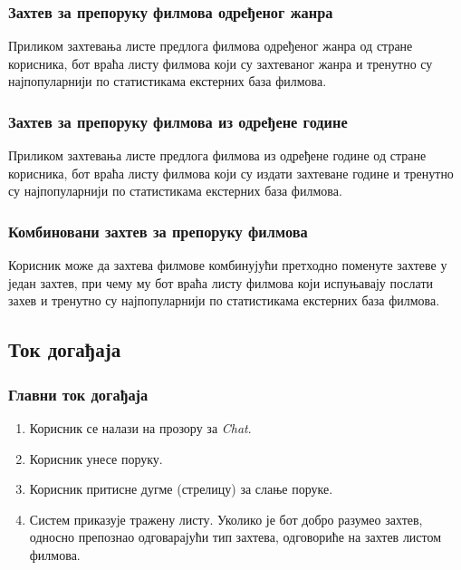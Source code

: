 \documentclass[12pt,a4paper]{article}
\begin{document}
\subsubsection{Захтев за препоруку филмова одређеног жанра}

Приликом захтевања листе предлога филмова одређеног жанра од стране корисника, бот враћа листу филмова који
су захтеваног жанра и тренутно су најпопуларнији по статистикама екстерних база филмова.

\subsubsection{Захтев за препоруку филмова из одређене године}

Приликом захтевања листе предлога филмова из одређене године од стране корисника, бот враћа листу филмова који
су издати захтеване године и тренутно су најпопуларнији по статистикама екстерних база филмова.

\subsubsection{Комбиновани захтев за препоруку филмова}

Корисник може да захтева филмове комбинујући претходно поменуте захтеве у један захтев, при чему му бот враћа
листу филмова који испуњавају послати захев и тренутно су најпопуларнији по статистикама екстерних база филмова.


\subsection{Ток догађаја}

   \subsubsection{Главни ток догађаја} 
 \begin{enumerate}
        \item {Корисник се налази на прозору за \textit{Chat}.}
        \item {Корисник унесе поруку.}
        \item {Корисник притисне дугме (стрелицу) за слање поруке.}
        \item {Систем приказује тражену листу.} \newline
    Уколико је бот добро разумео захтев, односно препознао одговарајући тип захтева, одговориће на захтев листом филмова.
   
\end{enumerate}
\end{document}
